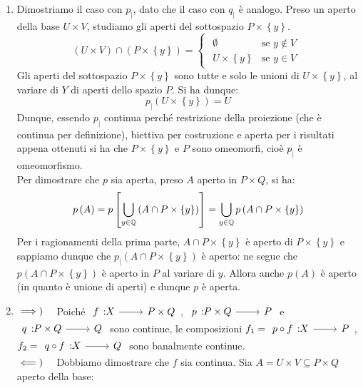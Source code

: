 \begin{demonstration}
\begin{enumerate}[label=\Roman*]
\begin{enumerate}[label=\alph*)]
\end{enumerate}
\item Dimostriamo il caso con $p_{\mid}$, dato che il caso con $q_{\mid}$ è analogo. Preso un aperto della base $U\times V$, studiamo gli aperti del sottospazio $P\times\left\{ y\right\}$.
\begin{equation*}
\left(U\times V\right)\cap \left(P\times\left\{ y\right\}\right)=\begin{cases}
	\begin{array}{ll}
		\emptyset & \text{se }y\notin V\\
		U\times\left\{y\right\} &\text{se }y\in V
	\end{array}

\end{cases}
\end{equation*}
Gli aperti del sottospazio $P\times\left\{ y\right\}$ sono tutte e solo le unioni di $U\times\left\{ y\right\}$, al variare di $Y$ di aperti dello spazio $P$. Si ha dunque:
\begin{equation*}
p_{\mid}\left(U\times \left\{y\right\}\right)=U
\end{equation*}
Dunque, essendo $p_{\mid}$ continua perché restrizione della proiezione (che è continua per definizione), biettiva per costruzione e aperta per i risultati appena ottenuti si ha che $P\times\left\{ y\right\}$ e $P$ sono omeomorfi, cioè $p_{\mid}$ è omeomorfismo.\\
Per dimostrare che $p$ sia aperta, preso $A$ aperto in $P\times Q$, si ha:
\begin{equation}
p\left(A\right)=p\left[\mathop{{\bigcup}}\displaylimits_{y\in\mathbb{Q}}\left(A\cap P\times\left\{ y\right\}\right)\right]=\mathop{{\bigcup}}\displaylimits_{y\in\mathbb{Q}}p\left(A\cap P\times\left\{ y\right\}\right)
\end{equation}
Per i ragionamenti della prima parte, $A\cap P\times\left\{ y\right\}$ è aperto di $P\times\left\{ y\right\}$ e sappiamo dunque che $p_{\mid}\left(A\cap P\times\left\{ y\right\}\right)$ è aperto: ne segue che $p\left(A\cap P\times\left\{ y\right\}\right)$ è aperto in $P$ al variare di $y$. Allora anche $p\left(A\right)$ è aperto (in quanto è unione di aperti) e dunque $p$ è aperta.
\item $\implies)\quad$ Poiché $\funz{f}{X}{P\times Q}$, $\funz{p}{P\times Q}{P}$ e $\funz{q}{P\times Q}{Q}$ sono continue, le composizioni $f_1=\funz{p\circ f}{X}{P}$, $f_2=\funz{q\circ f}{X}{Q}$ sono banalmente continue.\\
$\impliedby)\quad$ Dobbiamo dimostrare che $f$ sia continua. Sia $A=U\times V\subseteq P\times Q$ aperto della base:

\end{enumerate}
\end{demonstration}
